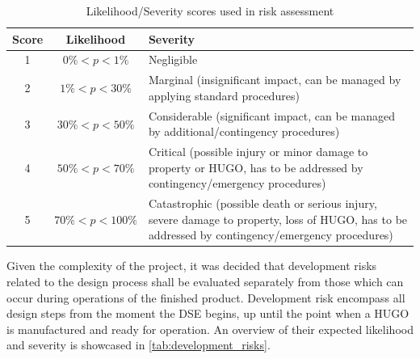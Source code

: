 \begin{table}[H]
    \centering
        \caption{Likelihood/Severity scores used in risk assessment \cite{MITRECorporation2012}}
    \begin{tabular}{|c|c|p{12cm}|}
    \hline
        \textbf{Score} & \textbf{Likelihood} & \textbf{Severity} \\ \hline\hline
         1 & $0\%< p<1\%$ & Negligible \\   \hline
         2 & $1\%<p<30\%$ & Marginal (insignificant impact, can be managed by applying standard procedures) \\   \hline
         3 & $30\%<p<50\%$& Considerable (significant impact, can be managed by additional/contingency procedures) \\   \hline
         4 & $50\%<p<70\%$& Critical (possible injury or minor damage to property or HUGO, has to be addressed by contingency/emergency procedures) \\   \hline
         5 & $70\%<p<100\%$& Catastrophic (possible death or serious injury, severe damage to property, loss of HUGO, has to be addressed by contingency/emergency procedures) \\   \hline
    \end{tabular}
    \label{tab:risk_map_scores}
\end{table}

Given the complexity of the project, it was decided that development risks related to the design process shall be evaluated separately from those which can occur during operations of the finished product. Development risk encompass all design steps from the moment the DSE begins, up until the point when a HUGO is manufactured and ready for operation. An overview of their expected likelihood and severity is showcased in \autoref{tab:development_risks}.

